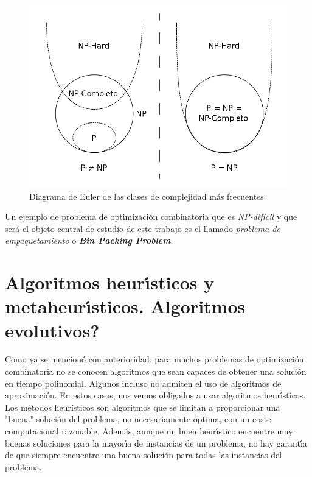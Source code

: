 \documentclass[a4paper, 12pt, oneside]{book}
\begin{document}
	\begin{figure}[h]
		\centering
		\includegraphics[scale = 0.4]{PNP.png}
		\caption{Diagrama de Euler de las clases de complejidad m\'as frecuentes}
		\label{fig:diagramaEuler}
	\end{figure}
	
	Un ejemplo de problema de optimizaci\'on combinatoria que es \textit{NP-dif\'icil} y que ser\'a el objeto central de estudio de este trabajo es el llamado \textit{problema de empaquetamiento} o \textbf{\textit{Bin Packing Problem}}.
	
	\section{Algoritmos heur\'{\i}sticos y metaheur\'{\i}sticos. Algoritmos evolutivos?}
	
	Como ya se mencion\'o con anterioridad, para muchos problemas de optimizaci\'on combinatoria no se conocen algoritmos que sean capaces de obtener una soluci\'on en tiempo polinomial. Algunos incluso no admiten el uso de algoritmos de aproximaci\'on. En estos casos, nos vemos obligados a usar algoritmos heur\'{\i}sticos.
	\\
	
	Los m\'etodos heur\'{i}sticos son algoritmos que se limitan a proporcionar una "buena" soluci\'on del problema, no necesariamente \'optima, con un coste computacional razonable. Adem\'as, aunque un buen heur\'{\i}stico encuentre muy buenas soluciones para la mayor\'{\i}a de instancias de un problema, no hay garant\'{\i}a de que siempre encuentre una buena soluci\'on para todas las instancias del problema.
	\\
	
\end{document}
